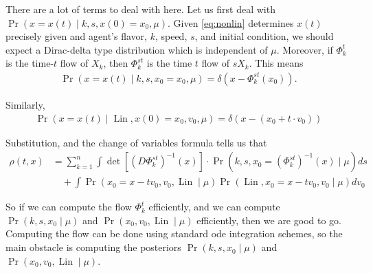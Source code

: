 \documentclass[12pt]{amsart}
\DeclareMathOperator{\Lin}{Lin}
\begin{document}
There are a lot of terms to deal with here.
Let us first deal with $\Pr( x = x(t) \mid k,s, x(0) = x_0, \mu )$.
Given \eqref{eq:nonlin} determines $x(t)$ precisely given and agent's flavor, $k$, speed, $s$, and initial condition,
we should expect a Dirac-delta type distribution which is independent of $\mu$.
Moreover, if $\Phi_k^t$ is the time-$t$ flow of $X_k$, then $\Phi_k^{st}$ is the time $t$ flow of $s X_k$. 
This means
\begin{align*}
	\Pr( x  = x(t) \mid k,s, x_0 = x_0 , \mu ) = \delta( x - \Phi_k^{st}( x_0) ).
\end{align*}

Similarly,
\begin{align*}
	\Pr( x = x(t) \mid \Lin, x(0) = x_0, v_0 , \mu ) = \delta \left( x - (x_0 + t \cdot v_0 ) \right)
\end{align*}

Substitution, and the change of variables formula tells us that
\begin{align*}
	\rho(t,x) &= \sum_{k=1}^n \int \det \left[ (D\Phi_{k}^{st})^{-1}(x)  \right] \cdot \Pr( k, s, x_0 = (\Phi_{k}^{st})^{-1} (x) \mid \mu) ds \\
		&\quad + \int \Pr( x_0 = x- t v_0 ,v_0, \Lin \mid \mu) \Pr( \Lin, x_0 =x- t v_0, v_0 \mid \mu )dv_0
\end{align*}

So if we can compute the flow $\Phi_k^{t}$ efficiently, and we can compute $\Pr( k,s,x_0 \mid \mu)$ and $\Pr( x_0, v_0, \Lin \mid \mu)$ efficiently, then we are good to go.
Computing the flow can be done using standard ode integration schemes, so the main obstacle is computing the posteriors $\Pr( k,s,x_0 \mid \mu)$ and $\Pr( x_0, v_0, \Lin \mid \mu)$.
\end{document}
